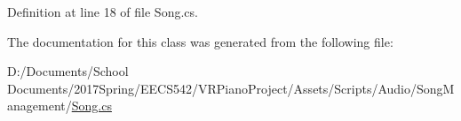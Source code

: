 Definition at line 18 of file Song.\+cs.



The documentation for this class was generated from the following file\+:\begin{DoxyCompactItemize}
\item 
D\+:/\+Documents/\+School Documents/2017\+Spring/\+E\+E\+C\+S542/\+V\+R\+Piano\+Project/\+Assets/\+Scripts/\+Audio/\+Song\+Management/\hyperlink{_song_8cs}{Song.\+cs}\end{DoxyCompactItemize}
